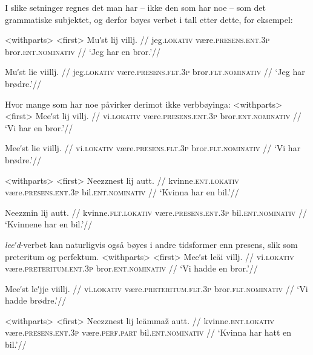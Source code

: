 I slike setninger regnes det man har – ikke den som har noe – som det grammatiske subjektet, og derfor bøyes verbet i tall etter dette, for eksempel:

\pex<withparts> %
\a<first> %
\begingl %
\gla Muʹst lij villj. //
\glb jeg.\textsc{lokativ} være.\textsc{presens.ent.3p} bror.\textsc{ent.nominativ} //
\glft `Jeg har en bror.'//
\endgl

\begingl %
\gla Muʹst lie viillj. //
\glb jeg.\textsc{lokativ} være.\textsc{presens.flt.3p} bror.\textsc{flt.nominativ} //
\glft `Jeg har brødre.'//
\endgl
\xe

Hvor mange som har noe påvirker derimot ikke verbbøyinga:
\pex<withparts> %
\a<first> %
\begingl %
\gla Meeʹst lij villj. //
\glb vi.\textsc{lokativ} være.\textsc{presens.ent.3p} bror.\textsc{ent.nominativ} //
\glft `Vi har en bror.'//
\endgl

\begingl %
\gla Meeʹst lie viillj. //
\glb vi.\textsc{lokativ} være.\textsc{presens.flt.3p} bror.\textsc{flt.nominativ} //
\glft `Vi har brødre.'//
\endgl
\xe

\pex<withparts> %
\a<first> %
\begingl %
\gla Neezznest lij autt. //
\glb kvinne.\textsc{ent.lokativ} være.\textsc{presens.ent.3p} bil.\textsc{ent.nominativ} //
\glft `Kvinna har en bil.'//
\endgl

\begingl %
\gla Neezznin lij autt. //
\glb kvinne.\textsc{flt.lokativ} være.\textsc{presens.ent.3p} bil.\textsc{ent.nominativ} //
\glft `Kvinnene har en bil.'//
\endgl
\xe

\textit{leeʹd}-verbet kan naturligvis også bøyes i andre tidsformer enn presens, slik som preteritum og perfektum.
\pex<withparts> %
\a<first> %
\begingl %
\gla Meeʹst leäi villj. //
\glb vi.\textsc{lokativ} være.\textsc{preteritum.ent.3p} bror.\textsc{ent.nominativ} //
\glft `Vi hadde en bror.'//
\endgl

\begingl %
\gla Meeʹst leʹjje viillj. //
\glb vi.\textsc{lokativ} være.\textsc{preteritum.flt.3p} bror.\textsc{flt.nominativ} //
\glft `Vi hadde brødre.'//
\endgl
\xe

\pex<withparts> %
\a<first> %
\begingl %
\gla Neezznest lij leämmaž autt. //
\glb kvinne.\textsc{ent.lokativ} være.\textsc{presens.ent.3p} være.\textsc{perf.part} bil.\textsc{ent.nominativ} //
\glft `Kvinna har hatt en bil.'//
\endgl

